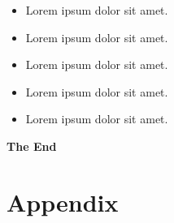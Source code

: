 


%
\begin{itemize}
	\item Lorem ipsum dolor sit amet.
	\item[\ding{51}] Lorem ipsum dolor sit amet.
	\item[\ding{61}] Lorem ipsum dolor sit amet.
	\item[\ding{86}] Lorem ipsum dolor sit amet.
	\item[\ding{108}] Lorem ipsum dolor sit amet.
\end{itemize}


\begin{center}
	\textbf{The End}
\end{center}

\newpage
\section*{\centering Appendix}
\renewcommand{\thesubsection}{\arabic{subsection}}
\vspace{0.4cm}

